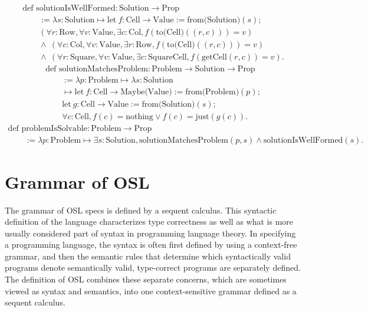 \documentclass[11pt]{article}
\begin{document}
\begin{equation}
	\begin{array}{l}
		\text{def solutionIsWellFormed} : \text{Solution} \to \text{Prop} \\
		\qquad := \lambda s : \text{Solution} \mapsto
		\text{let}\ f : \text{Cell} \to \text{Value} := \text{from(Solution)}(s); \\
		\qquad (\forall r : \text{Row}, \forall v : \text{Value},
			\exists c : \text{Col}, f(\text{to(Cell)}((r, c))) = v) \\
		\qquad \wedge\ (\forall c : \text{Col}, \forall v : \text{Value},
			\exists r : \text{Row}, f(\text{to(Cell)}((r, c))) = v) \\
		\qquad \wedge\ (\forall r : \text{Square}, \forall v : \text{Value},
			\exists c : \text{SquareCell}, f(\text{getCell}(r, c)) = v).
	\end{array}
\end{equation}
\begin{equation}
	\begin{array}{l}
		\text{def solutionMatchesProblem} : \text{Problem} \to \text{Solution} \to \text{Prop} \\
		\qquad := \lambda p : \text{Problem} \mapsto \lambda s : \text{Solution} \\
		\qquad \mapsto \text{let}\ f : \text{Cell} \to \text{Maybe(Value)} := \text{from(Problem)}(p); \\
		\qquad \text{let}\ g : \text{Cell} \to \text{Value} := \text{from(Solution)}(s); \\
		\qquad \forall c : \text{Cell}, f(c) = \text{nothing} \vee f(c) = \text{just}(g(c)).
	\end{array}
\end{equation}
\begin{equation}
	\begin{array}{l}
		\text{def problemIsSolvable} : \text{Problem} \to \text{Prop} \\
		\qquad := \lambda p : \text{Problem} \mapsto
		\exists s : \text{Solution}, \text{solutionMatchesProblem}(p,s)
		\wedge \text{solutionIsWellFormed}(s).
	\end{array}
\end{equation}


\section{Grammar of OSL}

The grammar of OSL specs is defined by a sequent calculus.
This syntactic definition of the language characterizes type
correctness as well as what is more usually considered
part of syntax in programming language theory. In
specifying a programming language, the syntax is often first defined by using a context-free grammar, and then
the semantic rules that determine
which syntactically valid programs denote semantically
valid, type-correct programs are separately defined. The definition of OSL
combines these separate concerns, which are sometimes viewed
as syntax and semantics, into one context-sensitive grammar
defined as a sequent calculus.
\end{document}
